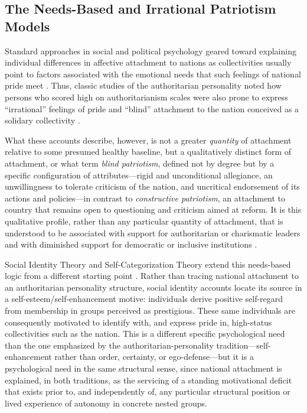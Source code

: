 \documentclass[12pt,letterpaper]{article}
\begin{document}
\subsection{The Needs-Based and Irrational Patriotism Models}

Standard approaches in social and political psychology geared toward explaining individual differences in affective attachment to nations as collectivities usually point to factors associated with the emotional needs that such feelings of national pride meet \citep{jost2007are-871}. Thus, classic studies of the authoritarian personality noted how persons who scored high on authoritarianism scales were also prone to express ``irrational'' feelings of pride and ``blind'' attachment to the nation conceived as a solidary collectivity \citep{adorno1950authoritarian-a52, pettigrew1999placing}. 

What these accounts describe, however, is not a greater \textit{quantity} of attachment relative to some presumed healthy baseline, but a qualitatively distinct form of attachment, or what \citet{schatz1999varieties} term \textit{blind patriotism}, defined not by degree but by a specific configuration of attributes---rigid and unconditional allegiance, an unwillingness to tolerate criticism of the nation, and uncritical endorsement of its actions and policies---in contrast to \textit{constructive patriotism}, an attachment to country that remains open to questioning and criticism aimed at reform. It is this qualitative profile, rather than any particular quantity of attachment, that is understood to be associated with support for authoritarian or charismatic leaders and with diminished support for democratic or inclusive institutions \citep{santos2024liberal-conservative-a61}.

Social Identity Theory and Self-Categorization Theory extend this needs-based logic from a different starting point \citep{hogg2000social-e0d}. Rather than tracing national attachment to an authoritarian personality structure, social identity accounts locate its source in a self-esteem/self-enhancement motive: individuals derive positive self-regard from membership in groups perceived as prestigious. These same individuals are consequently motivated to identify with, and express pride in, high-status collectivities such as the nation. This is a different specific psychological need than the one emphasized by the authoritarian-personality tradition---self-enhancement rather than order, certainty, or ego-defense---but it is a psychological need in the same structural sense, since national attachment is explained, in both traditions, as the servicing of a standing motivational deficit that exists prior to, and independently of, any particular structural position or lived experience of autonomy in concrete nested groups. 
\end{document}
